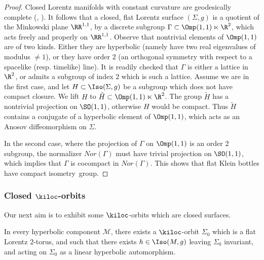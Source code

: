 \begin{proof}
Closed Lorentz manifolds with constant curvature are geodesically complete (\cite{carriere}, \cite{klingler}). It follows that a closed, flat Lorentz surface $(\Sigma, g)$ is a quotient of the Minkowski plane $\RR^{1,1}$, by a discrete subgroup $\Gamma \subset \Omp(1,1) \ltimes \R^2$, which acts freely and properly on $\RR^{1,1}$. Observe that nontrivial elements of $\Omp(1,1) $ are of two kinds. Either they are hyperbolic (namely have two real eigenvalues of modulus $\not = 1$), or they have order $2$ (an orthogonal symmetry with respect to a spacelike (resp. timelike) line). It is readily checked that $\Gamma$ is either a lattice in $\R^2$, or admits a subgroup of index $2$ which is such a lattice. Assume we are in the first case, and let $H \subset \Iso(\Sigma,g)$ be a subgroup which does not have compact closure. We lift $H$ to $\tilde{H} \subset \Omp(1,1) \ltimes \R^2$. The group $\tilde{H}$ has a nontrivial projection on $\SO(1,1)$, otherwise $H$ would be compact. Thus $\tilde{H}$ contains a conjugate of a hyperbolic element of $\Omp(1,1)$, which acts as an Anosov diffeomorphism on $\Sigma$.

In the second case, where the projection of $\Gamma$ on $\Omp(1,1)$ is an order $2$ subgroup, the normalizer $Nor(\Gamma)$ must have trivial projection on $\SO(1,1)$, which implies that $\Gamma$ is cocompact in $Nor(\Gamma)$. This shows that flat Klein bottles have compact isometry~group.
\end{proof}



\subsubsection{Closed \texorpdfstring{$\kiloc$}{kiloc}-orbits} Our next aim is to exhibit some $\kiloc$-orbits which are closed surfaces.

\begin{lemm}\label{lem.anosov.tore}
In every hyperbolic component ${\mathcal M}$, there exists a $\kiloc$-orbit $\Sigma_0$ which is a flat Lorentz $2$-torus, and such that there exists $h \in \Iso(M,g)$ leaving $\Sigma_0$ invariant, and acting on $\Sigma_0$ as a linear hyperbolic automorphism.
\end{lemm}




